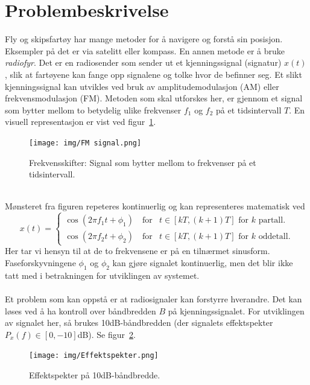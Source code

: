 \documentclass[a4paper,11pt,norsk]{article}
\begin{document}
\section{Problembeskrivelse}
\label{sec: problembeskrivelse}
Fly og skipsfartøy har mange metoder for å navigere og forstå sin posisjon. Eksempler på det er via satelitt eller kompass. En annen metode er å bruke \textit{radiofyr}. Det er en radiosender som sender ut et kjenningssignal (signatur) $x(t)$, slik at fartøyene kan fange opp signalene og tolke hvor de befinner seg. Et slikt kjenningssignal kan utvikles ved bruk av amplitudemodulasjon (AM) eller frekvensmodulasjon (FM). Metoden som skal utforskes her, er gjennom et signal som bytter mellom to betydelig ulike frekvenser $f_1$ og $f_2$ på et tidsintervall $T$.
En visuell representasjon er vist ved figur~\ref{fig: visuell FM}.
\\
\begin{figure}[!htbp]
    \centering
    \texttt{[image: img/FM signal.png]}
    \caption{Frekvensskifter: Signal som bytter mellom to frekvenser på et tidsintervall.}
    \label{fig: visuell FM}
\end{figure} \\
Mønsteret fra figuren repeteres kontinuerlig og kan representeres matematisk ved
\begin{equation*}
    x(t) =   
    \begin{cases}
    \cos{(2\pi f_1 t + \phi_1)} \quad \textrm{for} & t\in[kT, (k+1)T] \textrm{ for } k \textrm{ partall.}\\
    \cos{(2\pi f_2 t + \phi_2)} \quad \textrm{for} & t\in[kT, (k+1)T] \textrm{ for } k \textrm{ oddetall.}
    \end{cases}
\end{equation*}
Her tar vi hensyn til at de to frekvensene er på en tilnærmet sinusform. Faseforskyvningene $\phi_1$ og $\phi_2$ kan gjøre signalet kontinuerlig, men det blir ikke tatt med i betrakningen for utviklingen av systemet. \\
\\
Et problem som kan oppstå er at radiosignaler kan forstyrre hverandre. Det kan løses ved å ha kontroll over båndbredden $B$ på kjenningssignalet. For utviklingen av signalet her, så brukes 10dB-båndbredden (der signalets effektspekter $P_x(f)\in[0, -10]$dB). Se figur~\ref{fig: effektspekter}. \newpage
\begin{figure}[!hbtp]
    \centering
    \texttt{[image: img/Effektspekter.png]}
    \caption{Effektspekter på 10dB-båndbredde.}
    \label{fig: effektspekter}
\end{figure} \\
\end{document}
